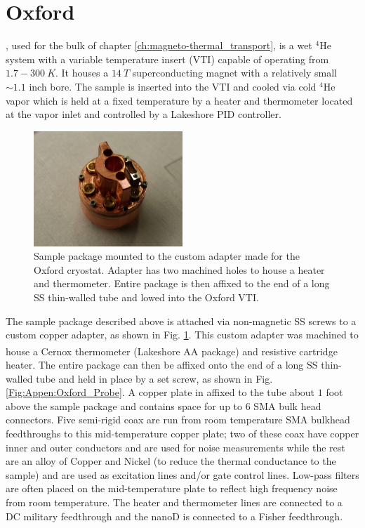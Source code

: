 \section{Oxford}
\label{Appen:Oxford}
, used for the bulk of chapter \ref{ch:magneto-thermal_transport}, is a wet $^4$He system with a variable temperature insert (VTI) capable of operating from $1.7-300~K$. It houses a $14~T$ superconducting magnet with a relatively small ${\sim}1.1$  inch bore. The sample is inserted into the VTI and cooled via cold $^4$He vapor which is held at a fixed temperature by a heater and thermometer located at the vapor inlet and controlled by a Lakeshore PID controller. 

\begin{figure}
\centering
\includegraphics[width = 0.5\textwidth]{figures/appendix/cryostats/Oxford_package.jpg}
\caption{Sample package mounted to the custom adapter made for the Oxford cryostat. Adapter has two machined holes to house a heater and thermometer. Entire package is then affixed to the end of a long SS thin-walled tube and lowed into the Oxford VTI.}
\label{Fig:Appen:Oxford_package}
\end{figure}

The sample package described above is attached via non-magnetic SS screws to a custom copper adapter, as shown in Fig. \ref{Fig:Appen:Oxford_package}. This custom adapter was machined to house a Cernox\textsuperscript{\textregistered} thermometer (Lakeshore AA package) and resistive cartridge heater. The entire package can then be affixed onto the end of a long SS thin-walled tube and held in place by a set screw, as shown in Fig. \ref{Fig:Appen:Oxford_Probe}. A copper plate in affixed to the tube about $1$ foot above the sample package and contains space for up to 6 SMA bulk head connectors. Five semi-rigid coax are run from room temperature SMA bulkhead feedthroughs to this mid-temperature copper plate; two of these coax have copper inner and outer conductors and are used for noise measurements while the rest are an alloy of Copper and Nickel (to reduce the thermal conductance to the sample) and are used as excitation lines and/or gate control lines. Low-pass filters are often placed on the mid-temperature plate to reflect high frequency noise from room temperature. The heater and thermometer lines are connected to a DC military feedthrough and the nanoD is connected to a Fisher feedthrough.

